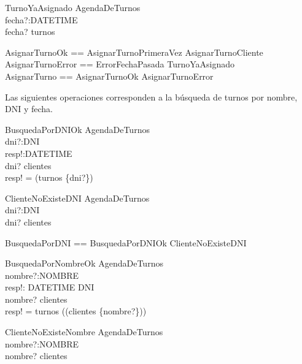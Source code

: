 \documentclass[%
  fleqn,colorlinks,linkcolor=blue,citecolor=blue,urlcolor=blue]{eptcs}
\begin{document}
  \begin{schema}{TurnoYaAsignado}
  \Xi AgendaDeTurnos \\
  fecha?:DATETIME \\
  \where
  fecha? \in turnos
  \end{schema}

  \begin{zed}
  AsignarTurnoOk  == AsignarTurnoPrimeraVez \lor AsignarTurnoCliente \\
  AsignarTurnoError == ErrorFechaPasada \lor TurnoYaAsignado \\
  AsignarTurno == AsignarTurnoOk \lor AsignarTurnoError
  \end{zed}

  Las siguientes operaciones corresponden a la b\'usqueda de turnos por nombre, DNI y fecha.

  \begin{schema}{BusquedaPorDNIOk}
  \Xi AgendaDeTurnos \\
  dni?:DNI \\
  resp!:\power DATETIME \\
  \where
  dni? \in \dom clientes \\
  resp! = \dom(turnos \rres \{dni?\})
  \end{schema}

  \begin{schema}{ClienteNoExisteDNI}
  \Xi AgendaDeTurnos \\
  dni?:DNI \\
  \where
  dni? \notin \dom clientes
  \end{schema}

  \begin{zed}
  BusquedaPorDNI == BusquedaPorDNIOk \lor ClienteNoExisteDNI
  \end{zed}

  \begin{schema}{BusquedaPorNombreOk}
  \Xi AgendaDeTurnos \\
  nombre?:NOMBRE \\
  resp!: DATETIME \pfun DNI \\
  \where
  nombre? \in \ran clientes \\
  resp! = turnos \rres (\dom (clientes \rres \{nombre?\}))
  \end{schema}

  \begin{schema}{ClienteNoExisteNombre}
  \Xi AgendaDeTurnos \\
  nombre?:NOMBRE \\
  \where
  nombre? \notin \ran clientes
  \end{schema}
\end{document}
